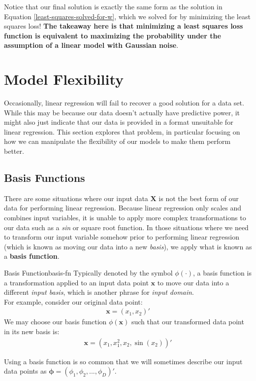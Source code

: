 Notice that our final solution is exactly the same form as the solution in Equation \ref{least-squares-solved-for-w}, which we solved for by minimizing the least squares loss! \textbf{The takeaway here is that minimizing a least squares loss function is equivalent to maximizing the probability under the assumption of a linear model with Gaussian noise}.

\section{Model Flexibility}
Occasionally, linear regression will fail to recover a good solution for a data set. While this may be because our data doesn't actually have predictive power, it might also just indicate that our data is provided in a format unsuitable for linear regression. This section explores that problem, in particular focusing on how we can manipulate the flexibility of our models to make them perform better.

\subsection{Basis Functions}
There are some situations where our input data $\textbf{X}$ is not the best form of our data for performing linear regression. Because linear regression only scales and combines input variables, it is unable to apply more complex transformations to our data such as a \textit{sin} or square root function. In those situations where we need to transform our input variable somehow prior to performing linear regression (which is known as moving our data into a new \textit{basis}), we apply what is known as a \textbf{basis function}.

\begin{definition}{Basis Function}{basis-fn}
    Typically denoted by the symbol $\phi(\cdot)$, a basis function is a transformation applied to an input data point $\textbf{x}$ to move our data into a different \textit{input basis}, which is another phrase for \textit{input domain}. \\

    For example, consider our original data point:
    \begin{align*}
        \textbf{x} = (x_{1}, x_{2})'
    \end{align*}
    We may choose our basis function $\phi(\textbf{x})$ such that our transformed data point in its new basis is:
    \begin{align*}
        \textbf{x} = (x_{1}, x_{1}^2, x_{2}, \sin(x_{2}))'
    \end{align*}

    Using a basis function is so common that we will sometimes describe our input data points as $\boldsymbol{\phi} = (\phi_{1}, \phi_{2}, ..., \phi_{D})'$.
\end{definition}

